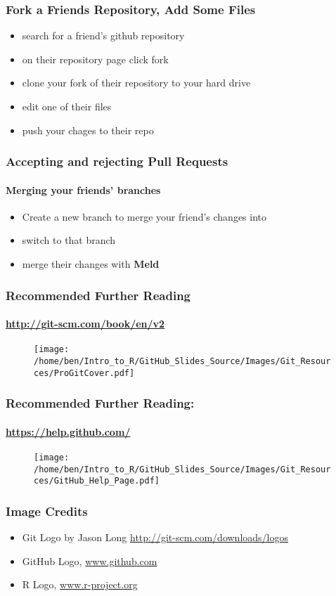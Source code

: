 \documentclass[xcolor=dvipsnames]{beamer}
\begin{document}
\begin{frame}
\frametitle{Fork a Friends Repository, Add Some Files}
\begin{itemize}
\item search for a friend's github repository
\newline
\item on their repository page click fork
\newline
\item clone your fork of their repository to your hard drive
\newline
\item edit one of their files
\newline
\item push your chages to their repo
\end{itemize}
\end{frame}

\begin{frame}
\frametitle{Accepting and rejecting Pull Requests}
\framesubtitle{Merging your friends' branches}
\begin{itemize}
\item Create a new branch to merge your friend's changes into 
\newline
\item switch to that branch
\newline
\item merge their changes with \textbf{Meld}
\end{itemize}
\end{frame}

\begin{frame}
\frametitle{Recommended Further Reading}
\framesubtitle{\url{http://git-scm.com/book/en/v2}}
\begin{center}
\begin{figure}
\texttt{[image: /home/ben/Intro\_to\_R/GitHub\_Slides\_Source/Images/Git\_Resources/ProGitCover.pdf]}
\end{figure}
\end{center}

\end{frame}

\begin{frame}
\frametitle{Recommended Further Reading:}
\framesubtitle{\url{https://help.github.com/}}
%
\begin{center}
\begin{figure}
\texttt{[image: /home/ben/Intro\_to\_R/GitHub\_Slides\_Source/Images/Git\_Resources/GitHub\_Help\_Page.pdf]}
\end{figure}

\end{center}

\end{frame}

\begin{frame}
\frametitle{Image Credits}
\begin{itemize}
\item Git Logo by Jason Long \url{http://git-scm.com/downloads/logos}
\item GitHub Logo, \url{www.github.com}
\item R Logo, \url{www.r-project.org}
\end{itemize}
\end{frame}
\end{document}
